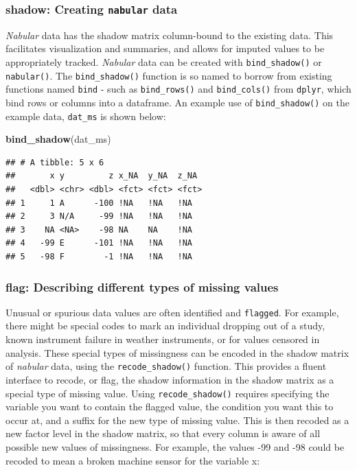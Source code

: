 \documentclass[]{article}
\newenvironment{Shaded}{\begin{snugshade}}{\end{snugshade}}
\newcommand{\KeywordTok}[1]{\textcolor[rgb]{0.13,0.29,0.53}{\textbf{#1}}}
\newcommand{\NormalTok}[1]{#1}
\theoremstyle{definition}
\theoremstyle{definition}
\theoremstyle{definition}
\theoremstyle{remark}
\begin{document}
\hypertarget{verbs-nabular}{%
\subsubsection{\texorpdfstring{shadow: Creating \texttt{nabular}
data}{shadow: Creating nabular data}}\label{verbs-nabular}}

\emph{Nabular} data has the shadow matrix column-bound to the existing
data. This facilitates visualization and summaries, and allows for
imputed values to be appropriately tracked. \emph{Nabular} data can be
created with \texttt{bind\_shadow()} or \texttt{nabular()}. The
\texttt{bind\_shadow()} function is so named to borrow from existing
functions named \texttt{bind} - such as \texttt{bind\_rows()} and
\texttt{bind\_cols()} from \texttt{dplyr}, which bind rows or columns
into a dataframe. An example use of \texttt{bind\_shadow()} on the
example data, \texttt{dat\_ms} is shown below:

\begin{Shaded}
\begin{Highlighting}[]
\KeywordTok{bind_shadow}\NormalTok{(dat_ms)}
\end{Highlighting}
\end{Shaded}

\begin{verbatim}
## # A tibble: 5 x 6
##       x y         z x_NA  y_NA  z_NA 
##   <dbl> <chr> <dbl> <fct> <fct> <fct>
## 1     1 A      -100 !NA   !NA   !NA  
## 2     3 N/A     -99 !NA   !NA   !NA  
## 3    NA <NA>    -98 NA    NA    !NA  
## 4   -99 E      -101 !NA   !NA   !NA  
## 5   -98 F        -1 !NA   !NA   !NA
\end{verbatim}

\hypertarget{verbs-recode}{%
\subsubsection{flag: Describing different types of missing
values}\label{verbs-recode}}

Unusual or spurious data values are often identified and
\texttt{flagged}. For example, there might be special codes to mark an
individual dropping out of a study, known instrument failure in weather
instruments, or for values censored in analysis. These special types of
missingness can be encoded in the shadow matrix of \emph{nabular} data,
using the \texttt{recode\_shadow()} function. This provides a fluent
interface to recode, or flag, the shadow information in the shadow
matrix as a special type of missing value. Using
\texttt{recode\_shadow()} requires specifying the variable you want to
contain the flagged value, the condition you want this to occur at, and
a suffix for the new type of missing value. This is then recoded as a
new factor level in the shadow matrix, so that every column is aware of
all possible new values of missingness. For example, the values -99 and
-98 could be recoded to mean a broken machine sensor for the variable x:
\end{document}
